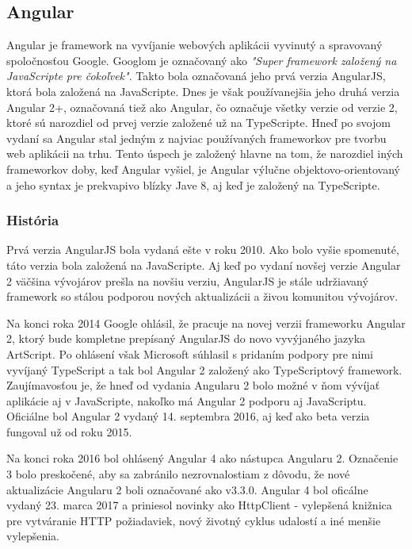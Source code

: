 \subsection{Angular}
\indent Angular je framework na vyvíjanie webových aplikácii vyvinutý a spravovaný spoločnosťou Google. Googlom je označovaný ako \textit{"Super framework založený na JavaScripte pre čokoľvek"}. Takto bola označovaná jeho prvá verzia AngularJS, ktorá bola založená na JavaScripte. Dnes je však používanejšia jeho druhá verzia Angular 2+, označovaná tiež ako Angular, čo označuje všetky verzie od verzie 2, ktoré sú narozdiel od prvej verzie založené už na TypeScripte. Hneď po svojom vydaní sa Angular stal jedným z najviac používaných frameworkov pre tvorbu web aplikácii na trhu. Tento úspech je založený hlavne na tom, že narozdiel iných frameworkov doby, keď Angular vyšiel, je Angular výlučne objektovo-orientovaný a jeho syntax je prekvapivo blízky Jave 8, aj keď je založený na TypeScripte. 

\subsubsection{História}
\indent Prvá verzia AngularJS bola vydaná ešte v roku 2010. Ako bolo vyšie spomenuté, táto verzia bola založená na JavaScripte. Aj keď po vydaní novšej verzie Angular 2 väčšina vývojárov prešla na novšiu verziu, AngularJS je stále udržiavaný framework so stálou podporou nových aktualizácii a živou komunitou vývojárov. 

\indent Na konci roka 2014 Google ohlásil, že pracuje na novej verzii frameworku Angular 2, ktorý bude kompletne prepísaný AngularJS do novo vyvýjaného jazyka ArtScript. Po ohlásení však Microsoft súhlasil s pridaním podpory pre nimi vyvíjaný TypeScript a tak bol Angular 2 založený ako TypeScriptový framework. Zaujímavosťou je, že hneď od vydania Angularu 2 bolo možné v ňom vývíjať aplikácie aj v JavaScripte, nakoľko má Angular 2 podporu aj JavaScriptu. Oficiálne bol Angular 2 vydaný 14. septembra 2016, aj keď ako beta verzia fungoval už od roku 2015. 

\indent Na konci roka 2016 bol ohlásený Angular 4 ako nástupca Angularu 2. Označenie 3 bolo preskočené, aby sa zabránilo nezrovnalostiam z dôvodu, že nové aktualizácie Angularu 2 boli označované ako v3.3.0. Angular 4 bol oficálne vydaný 23. marca 2017 a priniesol novinky ako HttpClient - vylepšená knižnica pre vytváranie HTTP požiadaviek, nový životný cyklus udalostí a iné menšie vylepšenia. 

